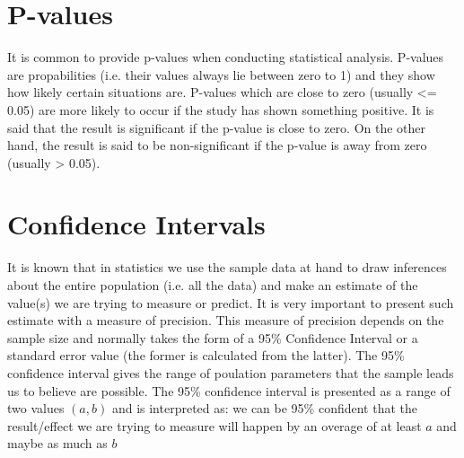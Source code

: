 \documentclass[a4paper,12pt, english]{article}
\begin{document}
\section{P-values}
It is common to provide p-values when conducting statistical analysis. P-values are propabilities (i.e. their values always lie between zero to 1) and they show how likely certain situations are. P-values which are close to zero (usually <= 0.05) are more likely to occur if the study has shown something positive. It is said that the result is significant if the p-value is close to zero. On the other hand, the result is said to be non-significant if the p-value is away from zero (usually > 0.05).

\section{Confidence Intervals}
It is known that in statistics we use the sample data at hand to draw inferences about the entire population (i.e. all the data) and make an estimate of the value(s) we are trying to measure or predict. It is very important to present such estimate with a measure of precision. This measure of precision depends on the sample size and normally takes the form of a 95\% Confidence Interval or a standard error value (the former is calculated from the latter). The 95\% confidence interval gives the range of poulation parameters that the sample leads us to believe are possible. 
The 95\% confidence interval is presented as a range of two values $(a,b)$ and is interpreted as: we can be 95\% confident that the result/effect we are trying to measure will happen by an overage of at least $a$ and maybe as much as $b$
\end{document}

